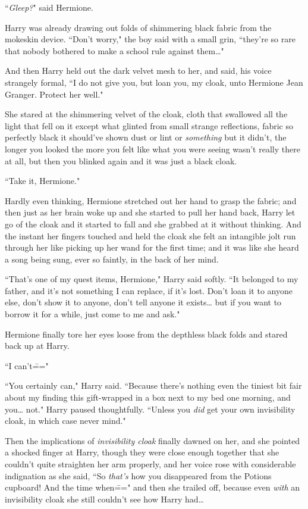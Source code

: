 ``\emph{Gleep?}" said Hermione.

Harry was already drawing out folds of shimmering black fabric from the mokeskin device. ``Don't worry," the boy said with a small grin, ``they're so rare that nobody bothered to make a school rule against them{\ldots}"

And then Harry held out the dark velvet mesh to her, and said, his voice strangely formal, ``I do not give you, but loan you, my cloak, unto Hermione Jean Granger. Protect her well."

She stared at the shimmering velvet of the cloak, cloth that swallowed all the light that fell on it except what glinted from small strange reflections, fabric so perfectly black it should've shown dust or lint or \emph{something} but it didn't, the longer you looked the more you felt like what you were seeing wasn't really there at all, but then you blinked again and it was just a black cloak.

``Take it, Hermione."

Hardly even thinking, Hermione stretched out her hand to grasp the fabric; and then just as her brain woke up and she started to pull her hand back, Harry let go of the cloak and it started to fall and she grabbed at it without thinking. And the instant her fingers touched and held the cloak she felt an intangible jolt run through her like picking up her wand for the first time; and it was like she heard a song being sung, ever so faintly, in the back of her mind.

``That's one of my quest items, Hermione," Harry said softly. ``It belonged to my father, and it's not something I can replace, if it's lost. Don't loan it to anyone else, don't show it to anyone, don't tell anyone it exists{\ldots} but if you want to borrow it for a while, just come to me and ask."

Hermione finally tore her eyes loose from the depthless black folds and stared back up at Harry.

``I can't\==="

``You certainly can," Harry said. ``Because there's nothing even the tiniest bit fair about my finding this gift-wrapped in a box next to my bed one morning, and you{\ldots} not." Harry paused thoughtfully. ``Unless you \emph{did} get your own invisibility cloak, in which case never mind."

Then the implications of \emph{invisibility cloak} finally dawned on her, and she pointed a shocked finger at Harry, though they were close enough together that she couldn't quite straighten her arm properly, and her voice rose with considerable indignation as she said, ``So \emph{that's} how you disappeared from the Potions cupboard! And the time when\===" and then she trailed off, because even \emph{with} an invisibility cloak she still couldn't see how Harry had{\ldots}

